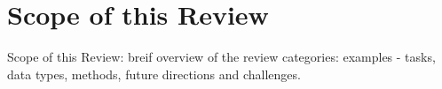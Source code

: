 \section{Scope of this Review}
Scope of this Review: breif overview of the review categories: examples - tasks, data types, methods, future directions and challenges.